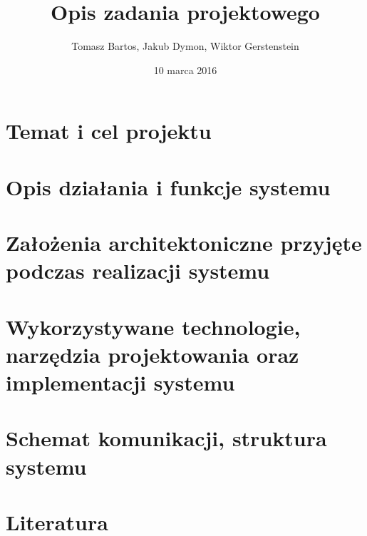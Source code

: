 \documentclass[a4paper, 11pt]{article}
\title{Opis zadania projektowego}
\author{Tomasz Bartos, Jakub Dymon, Wiktor Gerstenstein}
\date{10 marca 2016}
\begin{document}
\maketitle
\section{Temat i cel projektu}
\section{Opis działania i funkcje systemu}
\section{Założenia architektoniczne przyjęte podczas realizacji systemu}
\section{Wykorzystywane technologie, narzędzia projektowania oraz implementacji systemu}
\section{Schemat komunikacji, struktura systemu}
\section{Literatura}
\end{document}
